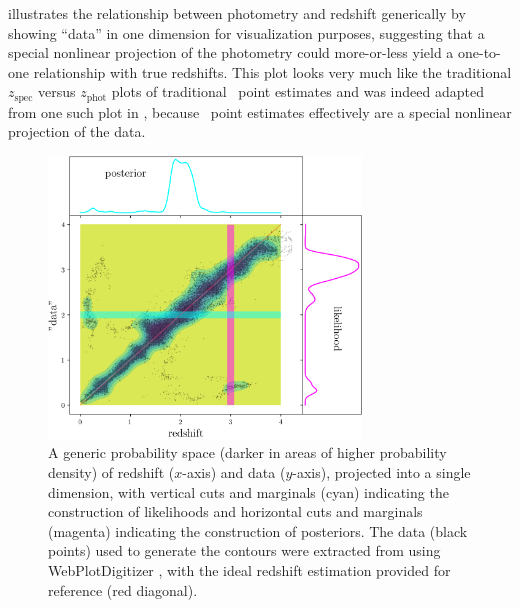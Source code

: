  illustrates the relationship between photometry and redshift generically by showing ``data'' in one dimension for visualization purposes, suggesting that a special nonlinear projection of the photometry could more-or-less yield a one-to-one relationship with true redshifts.
This plot looks very much like the traditional $z_{\mathrm{spec}}$ versus $z_{\mathrm{phot}}$ plots of traditional \pz\ point estimates and was indeed adapted from one such plot in \citet{jain_whole_2015}, because \pz\ point estimates effectively are a special nonlinear projection of the data.

\begin{figure}
	\begin{center}
		\includegraphics[width=0.74\textwidth]{figures/intro/jain05.png}
		\caption{
			A generic probability space (darker in areas of higher probability density) of redshift ($x$-axis) and data ($y$-axis), projected into a single dimension, with vertical cuts and marginals (cyan) indicating the construction of likelihoods and horizontal cuts and marginals (magenta) indicating the construction of posteriors.
			The data (black points) used to generate the contours were extracted from \citet{jain_whole_2015} using WebPlotDigitizer \citep{rohatgi_webplotdigitizer_2019}, with the ideal redshift estimation provided for reference (red diagonal).
		}
	\end{center}
\end{figure}

